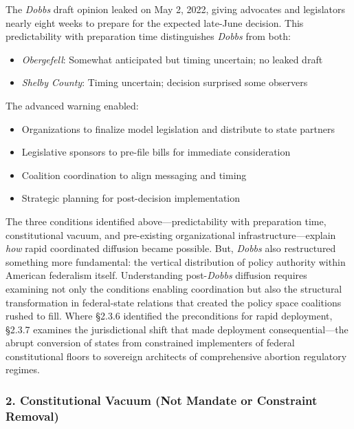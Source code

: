 The \emph{Dobbs} draft opinion leaked on May 2, 2022, giving advocates and legislators nearly eight weeks to prepare for the expected late-June decision. This predictability with preparation time distinguishes \emph{Dobbs} from both:
\begin{itemize}
\item \emph{Obergefell}: Somewhat anticipated but timing uncertain; no leaked draft
\item \emph{Shelby County}: Timing uncertain; decision surprised some observers
\end{itemize}

The advanced warning enabled:
\begin{itemize}
\item Organizations to finalize model legislation and distribute to state  partners \parencite{beckerThisAntiabortionGroup2022}
\item Legislative sponsors to pre-file bills for immediate consideration
\item Coalition coordination to align messaging and timing \parencite{millerLandscapeTodaysAntiAbortion2024}
\item Strategic planning for post-decision implementation
\end{itemize}

The three conditions identified above---predictability with preparation time, constitutional vacuum, and pre-existing organizational infrastructure---explain \emph{how} rapid coordinated diffusion became possible. But, \emph{Dobbs} also restructured something more fundamental: the vertical distribution of policy authority within American federalism itself. Understanding post-\emph{Dobbs} diffusion requires examining not only the conditions enabling coordination but also the structural transformation in federal-state relations that created the policy space coalitions rushed to fill. Where §2.3.6 identified the preconditions for rapid deployment, §2.3.7 examines the jurisdictional shift that made deployment consequential---the abrupt conversion of states from constrained implementers of federal constitutional floors to sovereign architects of comprehensive abortion regulatory regimes.
\subsubsection{2. Constitutional Vacuum (Not Mandate or Constraint Removal)}

